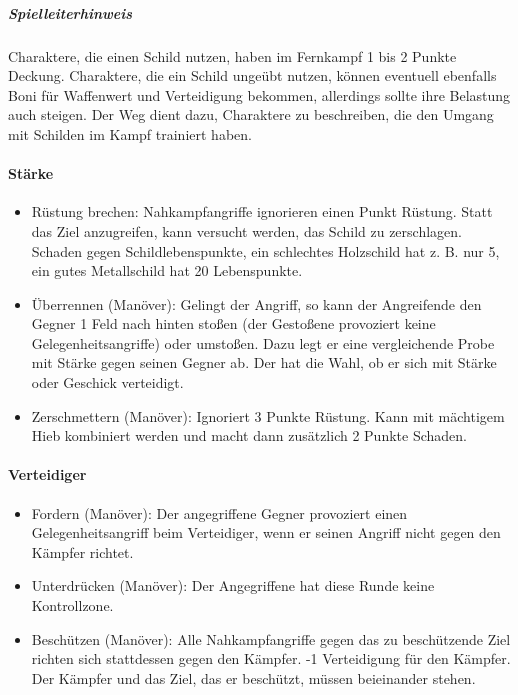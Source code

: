 \documentclass{article}
\begin{document}
\begin{mdframed}[hidealllines=true, backgroundcolor=black!10]
\subparagraph{Spielleiterhinweis}

Charaktere, die einen Schild nutzen, haben im Fernkampf 1  bis 2 Punkte Deckung. Charaktere, die ein Schild ungeübt
nutzen, können eventuell ebenfalls Boni für Waffenwert und Verteidigung bekommen, allerdings sollte ihre Belastung
auch steigen. Der Weg dient dazu, Charaktere zu beschreiben, die den Umgang mit Schilden im Kampf trainiert haben.

\end{mdframed}
\paragraph{Stärke}

\begin{itemize}
\item Rüstung brechen: Nahkampfangriffe ignorieren einen Punkt Rüstung. Statt das Ziel anzugreifen, kann versucht werden, das Schild zu zerschlagen. Schaden gegen Schildlebenspunkte, ein schlechtes Holzschild hat z. B. nur 5, ein gutes Metallschild hat 20 Lebenspunkte.
\item Überrennen (Manöver): Gelingt der Angriff, so kann der Angreifende den Gegner 1 Feld nach hinten stoßen (der Gestoßene provoziert keine Gelegenheitsangriffe) oder umstoßen. Dazu legt er eine vergleichende Probe mit Stärke gegen seinen Gegner ab. Der hat die Wahl, ob er sich mit Stärke oder Geschick verteidigt.
\item Zerschmettern (Manöver): Ignoriert 3 Punkte Rüstung. Kann mit mächtigem Hieb kombiniert werden und macht dann zusätzlich 2 Punkte Schaden.
\end{itemize}

\paragraph{Verteidiger}

\begin{itemize}
\item Fordern (Manöver): Der angegriffene Gegner provoziert einen Gelegenheitsangriff beim Verteidiger, wenn er seinen Angriff nicht gegen den Kämpfer richtet.
\item Unterdrücken (Manöver): Der Angegriffene hat diese Runde keine Kontrollzone.
\item Beschützen (Manöver): Alle Nahkampfangriffe gegen das zu beschützende Ziel richten sich stattdessen gegen den Kämpfer. -1 Verteidigung für den Kämpfer. Der Kämpfer und das Ziel, das er beschützt, müssen beieinander stehen.
\end{itemize}
\end{document}

